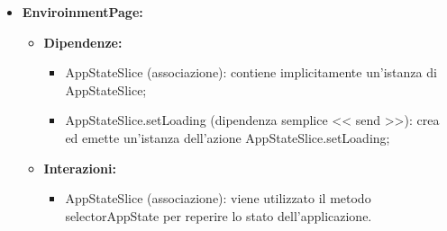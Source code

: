 \begin{itemize}
    \item \textbf{EnviroinmentPage:}
    \begin{itemize}
        \item \textbf{Dipendenze:}
        \begin{itemize}
            \item AppStateSlice (associazione): contiene implicitamente un'istanza di AppStateSlice;
            \item AppStateSlice.setLoading (dipendenza semplice << send >>):  crea ed emette un’istanza dell’azione AppStateSlice.setLoading;
        \end{itemize} 
        \item \textbf{Interazioni:}
        \begin{itemize}
            \item AppStateSlice (associazione): viene utilizzato il metodo selectorAppState per reperire lo stato dell'applicazione.
        \end{itemize}  
    \end{itemize}
\end{itemize}


